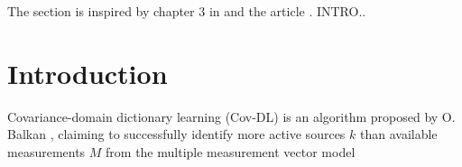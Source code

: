 The section is inspired by chapter 3 in \cite{phd2015} and the article \cite{Balkan2015}. INTRO.. 

\section{Introduction}
Covariance-domain dictionary learning (Cov-DL) is an algorithm proposed by O. Balkan \cite{Balkan2015}, claiming to successfully identify more active sources $k$ than available measurements $M$ from the multiple measurement vector model 

